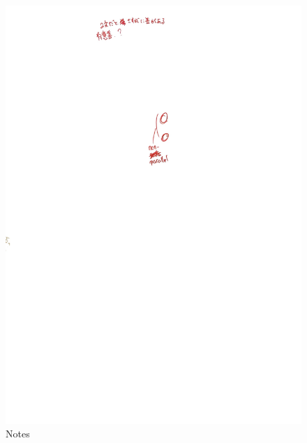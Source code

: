 \documentclass[a4paper, dvipdfmx]{jarticle}
\begin{document}
\begin{figure}[t]
\begin{minipage}{0.33\columnwidth}
        \includegraphics[clip, width=\linewidth]{fig/notes.jpg}
        {\footnotesize Notes}
    \end{minipage}\\
    \begin{minipage}{0.5\linewidth}
        \vspace{20mm}
        \centering

\end{minipage}
\end{figure}
\end{document}
